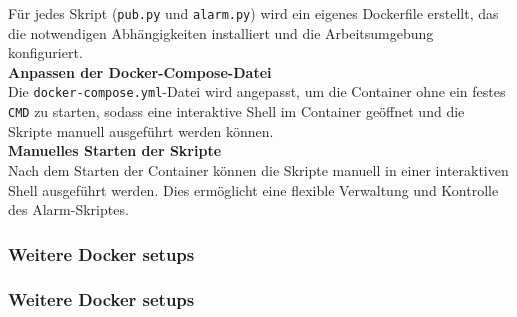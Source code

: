 Für jedes Skript (\texttt{pub.py} und \texttt{alarm.py}) wird ein eigenes Dockerfile erstellt, das die notwendigen Abhängigkeiten installiert und die Arbeitsumgebung konfiguriert. \\

\textbf{Anpassen der Docker-Compose-Datei}\\

Die \texttt{docker-compose.yml}-Datei wird angepasst, um die Container ohne ein festes \texttt{CMD} zu starten, sodass eine interaktive Shell im Container geöffnet und die Skripte manuell ausgeführt werden können. \\

\textbf{Manuelles Starten der Skripte}\\

Nach dem Starten der Container können die Skripte manuell in einer interaktiven Shell ausgeführt werden. Dies ermöglicht eine flexible Verwaltung und Kontrolle des Alarm-Skriptes.

\subsubsection{Weitere Docker setups}

\subsubsection{Weitere Docker setups }
